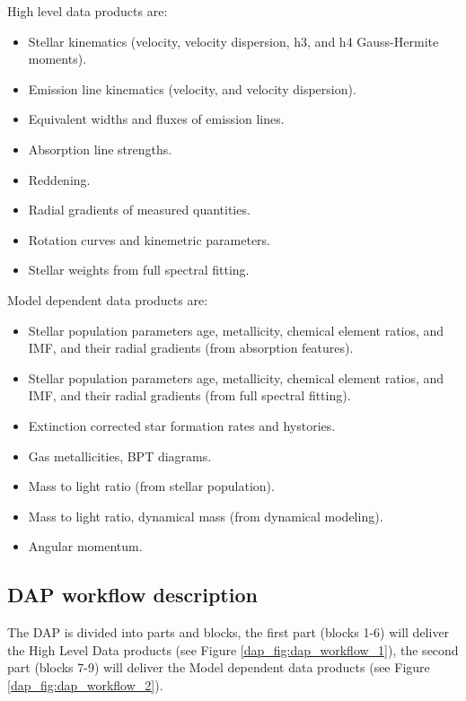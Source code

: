 \documentclass[11pt]{book}
\begin{document}
High level data products are:
\begin{itemize}
     \item Stellar kinematics (velocity, velocity dispersion, h3, and h4 Gauss-Hermite moments).
     \item Emission line kinematics (velocity, and velocity dispersion).
     \item Equivalent widths and fluxes of emission lines.
     \item Absorption line strengths.
     \item Reddening.
     \item Radial gradients of measured quantities.
     \item Rotation curves and kinemetric parameters.
     \item Stellar weights from full spectral fitting.
\end{itemize}

Model dependent data products are:
\begin{itemize}
    \item Stellar population parameters age, metallicity, chemical
      element ratios, and IMF, and their radial gradients (from absorption features).
    \item Stellar population parameters age, metallicity, chemical
      element ratios, and IMF, and their radial gradients (from full spectral fitting).
    \item Extinction corrected star formation rates and hystories.
    \item Gas metallicities, BPT diagrams.
    \item Mass to light ratio (from stellar population).
    \item Mass to light ratio, dynamical mass (from dynamical
      modeling).
    \item Angular momentum.
\end{itemize}%



\subsection{DAP workflow description}
\label{dap_sec:dap_workflow}

The DAP is divided into parts and blocks, the first part (blocks 1-6)
will deliver the High Level Data products (see Figure
\ref{dap_fig:dap_workflow_1}), the second part (blocks 7-9) will
deliver the Model dependent data products (see Figure
\ref{dap_fig:dap_workflow_2}). 
\end{document}
